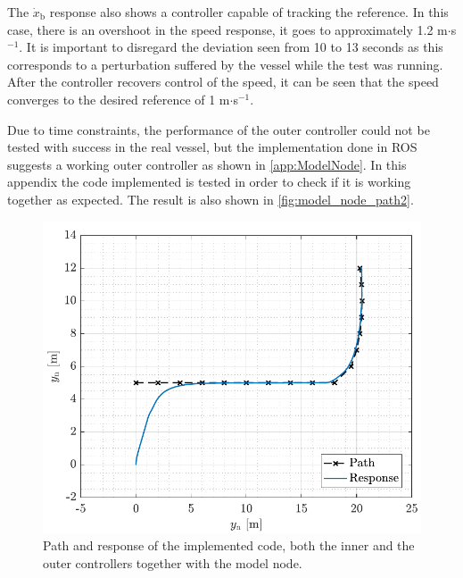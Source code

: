 The $\dot{x}_\mathrm{b}$ response also shows a controller capable of tracking the reference. In this case, there is an overshoot in the speed response, it goes to approximately 1.2 m$\cdot$s$^{-1}$. It is important to disregard the deviation seen from 10 to 13 seconds as this corresponds to a perturbation suffered by the vessel while the test was running. After the controller recovers control of the speed, it can be seen that the speed converges to the desired reference of 1 m$\cdot$s$^{-1}$. 

Due to time constraints, the performance of the outer controller could not be tested with success in the real vessel, but the implementation done in ROS suggests a working outer controller as shown in \autoref{app:ModelNode}. In this appendix the code implemented is tested in order to check if it is working together as expected. The result is also shown in \autoref{fig:model_node_path2}.
\begin{figure}[H]
    \includegraphics[width=.45\textwidth]{figures/model_node_path}
    \caption{Path and response of the implemented code, both the inner and the outer controllers together with the model node.}
    \label{fig:model_node_path2}
\end{figure}
